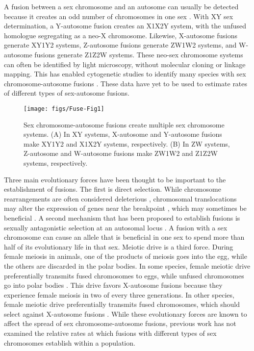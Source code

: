 A fusion between a sex chromosome and an autosome can usually be detected because it creates an odd number of chromosomes in one sex \citep[Figure \ref{fig:fuse-diag};][]{Ohno1967,White1973}. With XY sex determination, a Y-autosome fusion creates an X1X2Y system, with the unfused homologue segregating as a neo-X chromosome. Likewise, X-autosome fusions generate XY1Y2 systems, Z-autosome fusions generate ZW1W2 systems, and W-autosome fusions generate Z1Z2W systems. These neo-sex chromosome systems can often be identified by light microscopy, without molecular cloning or linkage mapping. This has enabled cytogenetic studies to identify many species with sex chromosome-autosome fusions \citep{White1973, Ezaz2009, Kitano2012, Yoshida2012, Maddison2013}. These data have yet to be used to estimate rates of different types of sex-autosome fusions.

\begin{figure}
\centering
\texttt{[image: figs/Fuse-Fig1]}
\caption[Schematic of sex chromosome fusions]{Sex chromosome-autosome fusions create multiple sex chromosome systems. (A) In XY systems, X-autosome and Y-autosome fusions make XY1Y2 and X1X2Y systems, respectively. (B) In ZW systems, Z-autosome and W-autosome fusions make ZW1W2 and Z1Z2W systems, respectively.}
\label{fig:fuse-diag}
\end{figure}

Three main evolutionary forces have been thought to be important to the establishment of fusions. The first is direct selection. While chromosome rearrangements are often considered deleterious \citep{King1993, Gardner2012}, chromosomal translocations may alter the expression of genes near the breakpoint \citep{Ohno1967, Dobigny2004}, which may sometimes be beneficial \citep{PerezOrtin2002, Chang2013}. A second mechanism that has been proposed to establish fusions is sexually antagonistic selection at an autosomal locus \citep{Charlesworth1982}. A fusion with a sex chromosome can cause an allele that is beneficial in one sex to spend more than half of its evolutionary life in that sex. Meiotic drive is a third force. During female meiosis in animals, one of the products of meiosis goes into the egg, while the others are discarded in the polar bodies. In some species, female meiotic drive preferentially transmits fused chromosomes to eggs, while unfused chromosomes go into polar bodies \citep{Pardo2001a, Pardo2001b}. This drive favors X-autosome fusions because they experience female meiosis in two of every three generations. In other species, female meiotic drive preferentially transmits fused chromosomes, which should select against X-autosome fusions \citep{Yoshida2012}. While these evolutionary forces are known to affect the spread of sex chromosome-autosome fusions, previous work has not examined the relative rates at which fusions with different types of sex chromosomes establish within a population.
 
